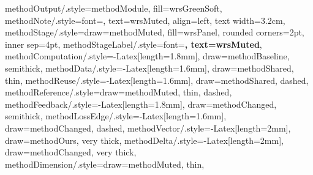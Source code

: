 {  methodOutput/.style={methodModule, fill=wrsGreenSoft},
  methodNote/.style={font=\scriptsize, text=wrsMuted, align=left,
    text width=3.2cm},
  methodStage/.style={draw=methodMuted, fill=wrsPanel, rounded corners=2pt,
    inner sep=4pt},
  methodStageLabel/.style={font=\scriptsize\bfseries, text=wrsMuted},
  methodComputation/.style={-{Latex[length=1.8mm]}, draw=methodBaseline,
    semithick},
  methodData/.style={-{Latex[length=1.6mm]}, draw=methodShared, thin},
  methodReuse/.style={-{Latex[length=1.6mm]}, draw=methodShared, dashed},
  methodReference/.style={draw=methodMuted, thin, dashed},
  methodFeedback/.style={-{Latex[length=1.8mm]}, draw=methodChanged,
    semithick},
  methodLossEdge/.style={-{Latex[length=1.6mm]}, draw=methodChanged, dashed},
  methodVector/.style={-{Latex[length=2mm]}, draw=methodOurs, very thick},
  methodDelta/.style={-{Latex[length=2mm]}, draw=methodChanged, very thick},
  methodDimension/.style={draw=methodMuted, thin},
}
